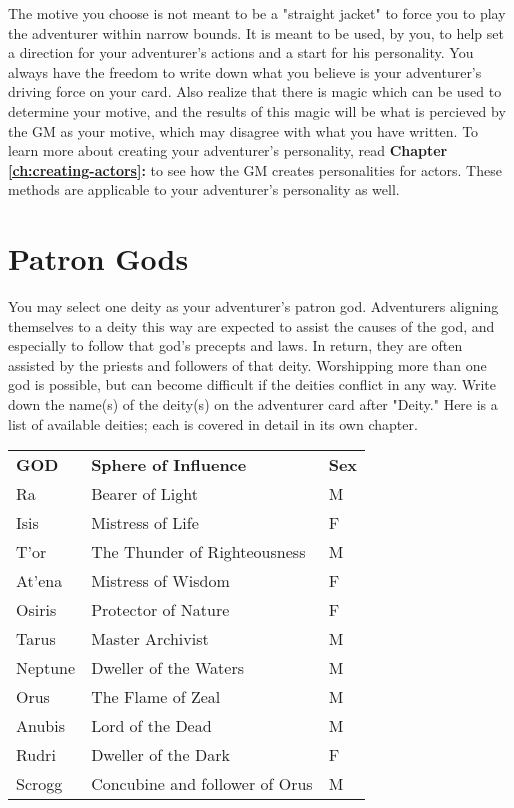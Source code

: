 \begin{multicols*}{2}
The motive you choose is not meant to be a "straight jacket" to force you to play the adventurer within narrow bounds. It is meant to be used, by you, to help set a direction for your adventurer’s actions and a start for his personality. You always have the freedom to write down what you believe is your adventurer’s driving force on your card. Also realize that there is magic which can be used to determine your motive, and the results of this magic will be what is percieved by the GM as your motive, which may disagree with what you have written.
To learn more about creating your adventurer's personality, read \textbf{Chapter \ref{ch:creating-actors}: } to see how the GM creates personalities for actors. These methods are applicable to your adventurer’s personality as well.
\section{Patron Gods}
You may select one deity as your adventurer’s patron god. Adventurers aligning themselves to a deity this way are expected to assist the causes of the god, and especially to follow that god’s precepts and laws. In return, they are often assisted by the priests and followers of that deity. Worshipping more than one god is possible, but can become difficult if the deities conflict in any way. Write down the name(s) of the deity(s) on the adventurer card after "Deity." Here is a list of available deities; each is covered in detail in its own chapter.

\begin{tabular}{@{}l l l}
\textbf{GOD} & \textbf{Sphere of Influence} & \textbf{Sex}\\
Ra & Bearer of Light & M\\
Isis & Mistress of Life & F\\
T’or & The Thunder of Righteousness & M\\
At’ena & Mistress of Wisdom & F\\
Osiris & Protector of Nature & F\\
Tarus & Master Archivist & M\\
Neptune & Dweller of the Waters & M\\
Orus & The Flame of Zeal & M\\
Anubis & Lord of the Dead & M\\
Rudri & Dweller of the Dark & F\\
Scrogg & Concubine and follower of Orus & M\\
\end{tabular}

\end{multicols*}
